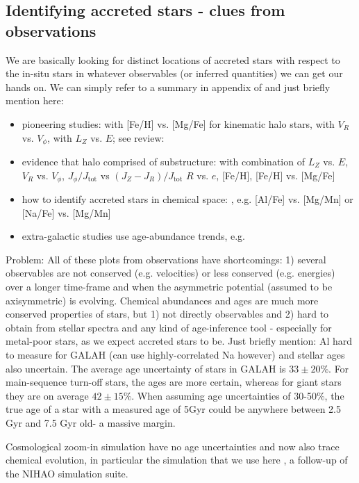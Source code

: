 \documentclass[fleqn,usenatbib]{mnras}
\begin{document}
\subsection{Identifying accreted stars - clues from observations}

We are basically looking for distinct locations of accreted stars with respect to the in-situ stars in whatever observables (or inferred quantities) we can get our hands on. We can simply refer to a summary in appendix of \citet{Buder2022} and just briefly mention here:
\begin{itemize}
    \item pioneering studies: \citet{Nissen2010} with [Fe/H] vs. [Mg/Fe] for kinematic halo stars, \citet{Belokurov2018} with $V_R$ vs. $V_\phi$, \citet{Helmi2018} with $L_Z$ vs. $E$; see review: \citet{Helmi2020}
    \item evidence that halo comprised of substructure: \citet{Naidu2020} with combination of $L_Z$ vs. $E$, $V_R$ vs. $V_\phi$, $J_\phi/J_\text{tot}$ vs $(J_Z - J_R)/J_\text{tot}$ $R$ vs. $e$, [Fe/H], [Fe/H] vs. [Mg/Fe]
    \item how to identify accreted stars in chemical space: \citet{Hawkins2015, Das2020, Buder2022}, e.g. [Al/Fe] vs. [Mg/Mn] or [Na/Fe] vs. [Mg/Mn]
    \item extra-galactic studies use age-abundance trends, e.g. \citet{Martig2021}
\end{itemize}

Problem: All of these plots from observations have shortcomings: 1) several observables are not conserved (e.g. velocities) or less conserved (e.g. energies) over a longer time-frame and when the asymmetric potential (assumed to be axisymmetric) is evolving. Chemical abundances and ages are much more conserved properties of stars, but 1) not directly observables and 2) hard to obtain from stellar spectra and any kind of age-inference tool - especially for metal-poor stars, as we expect accreted stars to be. Just briefly mention: Al hard to measure for GALAH (can use highly-correlated Na however) and stellar ages also uncertain. The average age uncertainty of stars in GALAH is $33 \pm 20\%$. For main-sequence turn-off stars, the ages are more certain, whereas for giant stars they are on average $42 \pm 15\%$. When assuming age uncertainties of 30-50\%, the true age of a star with a measured age of 5Gyr could be anywhere between 2.5 Gyr and 7.5 Gyr old- a massive margin.

Cosmological zoom-in simulation have no age uncertainties and now also trace chemical evolution, in particular the simulation that we use here \citep{Buck2021}, a follow-up of the NIHAO simulation suite.
\end{document}
